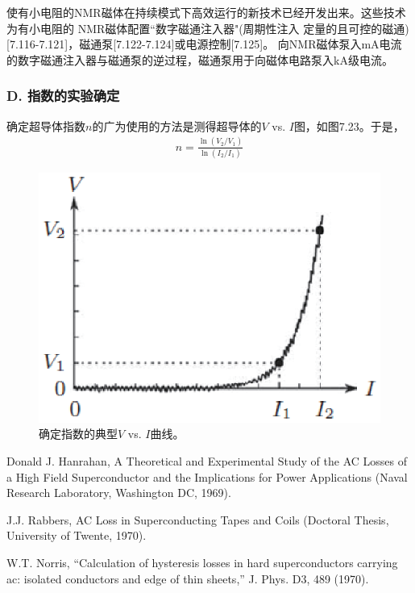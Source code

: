 使有小电阻的NMR磁体在持续模式下高效运行的新技术已经开发出来。这些技术为有小电阻的
NMR磁体配置``数字磁通注入器"(周期性注入
定量的且可控的磁通)[7.116-7.121]，磁通泵[7.122-7.124]或电源控制[7.125]。
向NMR磁体泵入mA电流的数字磁通注入器与磁通泵的逆过程，磁通泵用于向磁体电路泵入kA级电流。

\subsubsection*{D. 指数的实验确定}
确定超导体指数$n$的广为使用的方法是测得超导体的$V$ vs. $I$图，如图7.23。于是，
\begin{align*}%
n=\frac{\ln(V_2/V_1)}{\ln(I_2/I_1)} \tag{7.48}
\end{align*}

\begin{figure}[htbp]
	\centering
	\includegraphics[scale=0.8]{chpt7/figs/fig7.23.eps}
	\caption{确定指数的典型$V$ vs. $I$曲线。}
\end{figure}

\noindent [7.1] Donald J. Hanrahan, A Theoretical and Experimental Study of the AC Losses of a High Field Superconductor and the Implications for Power Applications (Naval Research Laboratory, Washington DC, 1969).

\noindent [7.2] J.J. Rabbers, AC Loss in Superconducting Tapes and Coils (Doctoral Thesis, University of Twente, 1970).

\noindent [7.3] W.T. Norris, ``Calculation of hysteresis losses in hard superconductors carrying ac: isolated conductors and edge of thin sheets,” J. Phys. D3, 489 (1970).

